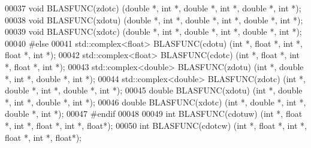 \begin{DoxyCode}
00037 \textcolor{keywordtype}{void}  BLASFUNC(zdotc)  (\textcolor{keywordtype}{double} *, \textcolor{keywordtype}{int} *, \textcolor{keywordtype}{double}  *, \textcolor{keywordtype}{int} *, \textcolor{keywordtype}{double}  *, \textcolor{keywordtype}{int} *);
00038 \textcolor{keywordtype}{void}  BLASFUNC(xdotu)  (\textcolor{keywordtype}{double} *, \textcolor{keywordtype}{int} *, \textcolor{keywordtype}{double}  *, \textcolor{keywordtype}{int} *, \textcolor{keywordtype}{double}  *, \textcolor{keywordtype}{int} *);
00039 \textcolor{keywordtype}{void}  BLASFUNC(xdotc)  (\textcolor{keywordtype}{double} *, \textcolor{keywordtype}{int} *, \textcolor{keywordtype}{double}  *, \textcolor{keywordtype}{int} *, \textcolor{keywordtype}{double}  *, \textcolor{keywordtype}{int} *);
00040 \textcolor{preprocessor}{#else}
00041 std::complex<float>   BLASFUNC(cdotu)  (\textcolor{keywordtype}{int} *, \textcolor{keywordtype}{float}  *, \textcolor{keywordtype}{int} *, \textcolor{keywordtype}{float}  *, \textcolor{keywordtype}{int} *);
00042 std::complex<float>   BLASFUNC(cdotc)  (\textcolor{keywordtype}{int} *, \textcolor{keywordtype}{float}  *, \textcolor{keywordtype}{int} *, \textcolor{keywordtype}{float}  *, \textcolor{keywordtype}{int} *);
00043 std::complex<double>  BLASFUNC(zdotu)  (\textcolor{keywordtype}{int} *, \textcolor{keywordtype}{double}  *, \textcolor{keywordtype}{int} *, \textcolor{keywordtype}{double}  *, \textcolor{keywordtype}{int} *);
00044 std::complex<double>  BLASFUNC(zdotc)  (\textcolor{keywordtype}{int} *, \textcolor{keywordtype}{double}  *, \textcolor{keywordtype}{int} *, \textcolor{keywordtype}{double}  *, \textcolor{keywordtype}{int} *);
00045 \textcolor{keywordtype}{double}  BLASFUNC(xdotu)  (\textcolor{keywordtype}{int} *, \textcolor{keywordtype}{double}  *, \textcolor{keywordtype}{int} *, \textcolor{keywordtype}{double}  *, \textcolor{keywordtype}{int} *);
00046 \textcolor{keywordtype}{double}  BLASFUNC(xdotc)  (\textcolor{keywordtype}{int} *, \textcolor{keywordtype}{double}  *, \textcolor{keywordtype}{int} *, \textcolor{keywordtype}{double}  *, \textcolor{keywordtype}{int} *);
00047 \textcolor{preprocessor}{#endif}
00048 
00049 \textcolor{keywordtype}{int}  BLASFUNC(cdotuw)  (\textcolor{keywordtype}{int} *, \textcolor{keywordtype}{float}  *, \textcolor{keywordtype}{int} *, \textcolor{keywordtype}{float}  *, \textcolor{keywordtype}{int} *, \textcolor{keywordtype}{float}*);
00050 \textcolor{keywordtype}{int}  BLASFUNC(cdotcw)  (\textcolor{keywordtype}{int} *, \textcolor{keywordtype}{float}  *, \textcolor{keywordtype}{int} *, \textcolor{keywordtype}{float}  *, \textcolor{keywordtype}{int} *, \textcolor{keywordtype}{float}*);

\end{DoxyCode}
